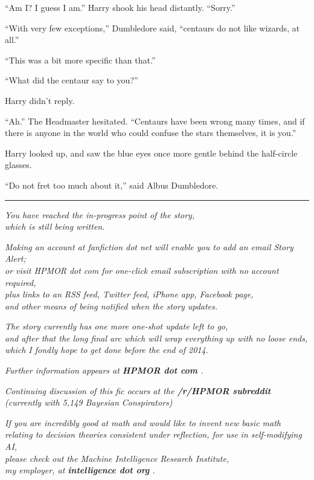 ``Am I? I guess I am.'' Harry shook his head distantly. ``Sorry.''

``With very few exceptions,'' Dumbledore said, ``centaurs do not like
wizards, at all.''

``This was a bit more specific than that.''

``What did the centaur say to you?''

Harry didn't reply.

``Ah.'' The Headmaster hesitated. ``Centaurs have been wrong many times,
and if there is anyone in the world who could confuse the stars
themselves, it is you.''

Harry looked up, and saw the blue eyes once more gentle behind the
half-circle glasses.

``Do not fret too much about it,'' said Albus Dumbledore.

\begin{center}\rule{3in}{0.4pt}\end{center}

\emph{You have reached the in-progress point of the story,}\\
\emph{which is still being written.}

\emph{Making an account at fanfiction dot net will enable you to add an
email Story Alert;}\\ \emph{or visit HPMOR dot com for one-click email
subscription with no account required,}\\ \emph{plus links to an RSS
feed, Twitter feed, iPhone app, Facebook page,}\\ \emph{and other means
of being notified when the story updates.}

\emph{The story currently has one more one-shot update left to go,\\ and
after that the long final arc which will wrap everything up with no
loose ends,\\ which I fondly hope to get done before the end of 2014.}

\emph{Further information appears at \textbf{HPMOR dot com} .}

\emph{Continuing discussion of this fic occurs at the \textbf{/r/HPMOR
subreddit}}\\ \emph{(currently with 5,149 Bayesian Conspirators)}

\emph{If you are incredibly good at math and would like to invent new
basic math}\\ \emph{relating to decision theories consistent under
reflection, for use in self-modifying AI,}\\ \emph{please check out the
Machine Intelligence Research Institute,}\\ \emph{my employer, at
\textbf{intelligence dot org} .}

